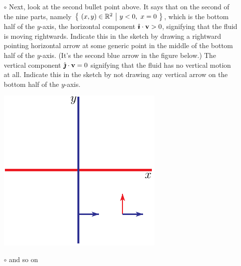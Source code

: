 \begin{eg}
\begin{itemize}
\item[$\circ$]
Next, look at the second bullet point above. It says that on the second of the nine parts, namely $\big\{\ (x,y)\in\bbbr^2\ \big|\  y<0,\ x=0\ \big\}$,
which is the bottom half of the $y$-axis, 
the horizontal component  $\hat{\pmb{\imath}}\cdot\mathbf{v}>0$, signifying that the fluid is moving
rightwards. Indicate this in the sketch by drawing a rightward pointing 
horizontal arrow at some generic point in the middle of the bottom half 
of the $y$-axis. (It's the second blue arrow in the figure below.) 
The vertical component  $\hat{\pmb{\jmath}}\cdot\mathbf{v}=0$ signifying that the fluid has
no vertical motion at all. Indicate this in the sketch by not drawing any 
vertical arrow on the bottom half of the $y$-axis.
\begin{efig}
\begin{center}
    \includegraphics[scale=0.8]{phaseVortex5.pdf}
\end{center}
\end{efig}


\item[$\circ$]
and so on


\end{itemize}
\end{eg}

